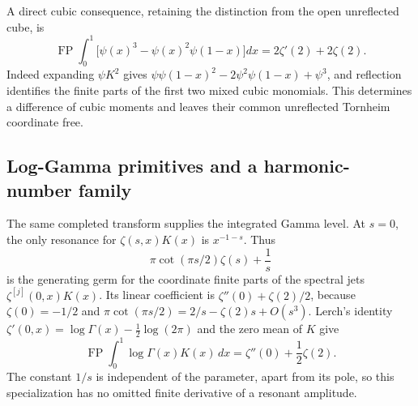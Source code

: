 \documentclass[11pt,a4paper]{article}
\numberwithin{equation}{section}
\theoremstyle{definition}
\theoremstyle{remark}
\begin{document}
A direct cubic consequence, retaining the distinction from the open
unreflected cube, is
\begin{equation}\label{ct:cubic-difference}
 \operatorname{FP}\int_0^1
 \bigl[\psi(x)^3-\psi(x)^2\psi(1-x)\bigr]dx
      =2\zeta'(2)+2\zeta(2).
\end{equation}
Indeed expanding $\psi K^2$ gives
$\psi\psi(1-x)^2-2\psi^2\psi(1-x)+\psi^3$, and reflection identifies
the finite parts of the first two mixed cubic monomials. This determines
a difference of cubic moments and leaves their common unreflected
Tornheim coordinate free.

\subsection{Log-Gamma primitives and a harmonic-number family}

The same completed transform supplies the integrated Gamma level.
At $s=0$, the only resonance for $\zeta(s,x)K(x)$ is $x^{-1-s}$.
Thus
\[
 \pi\cot(\pi s/2)\zeta(s)+\frac1s
\]
is the generating germ for the coordinate finite parts of the spectral
jets $\zeta^{[j]}(0,x)K(x)$. Its linear coefficient is
$\zeta''(0)+\zeta(2)/2$, because
$\zeta(0)=-1/2$ and
$\pi\cot(\pi s/2)=2/s-\zeta(2)s+O(s^3)$.
Lerch's identity \cite[Eq.~25.11.18]{DLMFHurwitz} $\zeta'(0,x)=\log\Gamma(x)-\tfrac12\log(2\pi)$
and the zero mean of $K$ give
\begin{equation}\label{ct:loggamma-K}
 \operatorname{FP}\int_0^1\log\Gamma(x)K(x)\,dx
       =\zeta''(0)+\frac12\zeta(2).
\end{equation}
The constant $1/s$ is independent of the parameter, apart from its
pole, so this specialization has no omitted finite derivative of a
resonant amplitude.
\end{document}
